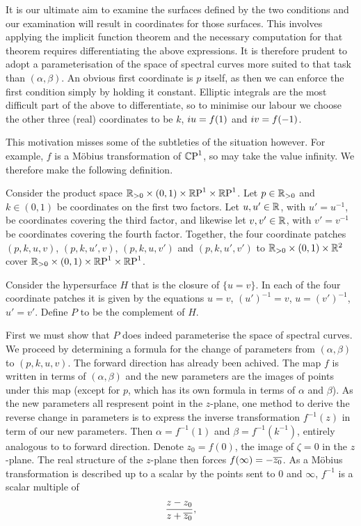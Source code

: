 It is our ultimate aim to examine the surfaces defined by the two conditions and our examination will result in coordinates for those surfaces. This involves applying the implicit function theorem and the necessary computation for that theorem requires differentiating the above expressions. It is therefore prudent to adopt a parameterisation of the space of spectral curves more suited to that task than $(α,β)$. An obvious first coordinate is $p$ itself, as then we can enforce the first condition simply by holding it constant. Elliptic integrals are the most difficult part of the above to differentiate, so to minimise our labour we choose the other three (real) coordinates to be $k$, $i u = f(1)$ and $i v = f(-1)$.

This motivation misses some of the subtleties of the situation however. For example, $f$ is a M\"obius transformation of $\mathbb{C}\text{P}^1$, so may take the value infinity. We therefore make the following definition.

\begin{defn}\label{defn:parameter space}
Consider the product space $\mathbb{R}_{>0} \times (0,1) \times \mathbb{R}\text{P}^1 \times \mathbb{R}\text{P}^1$. Let $p \in \mathbb{R}_{>0}$ and $k \in (0,1)$ be coordinates on the first two factors. Let $u, u' \in \mathbb{R}$, with $u' = u^{-1}$, be coordinates covering the third factor, and likewise let $v, v' \in\mathbb{R}$, with $v' = v^{-1}$ be coordinates covering the fourth factor. Together, the four coordinate patches $(p,k,u,v)$, $(p,k,u',v)$, $(p,k,u,v')$ and $(p,k,u',v')$ to $\mathbb{R}_{>0} \times (0,1) \times \mathbb{R}^2$ cover $\mathbb{R}_{>0} \times (0,1) \times \mathbb{R}\text{P}^1 \times \mathbb{R}\text{P}^1$.

Consider the hypersurface $H$ that is the closure of $\{u=v\}$. In each of the four coordinate patches it is given by the equations $u=v$, $(u')^{-1} = v$, $u = (v')^{-1}$, $u' = v'$. Define $P$ to be the complement of $H$.
\end{defn}

First we must show that $P$ does indeed parameterise the space of spectral curves. We proceed by determining a formula for the change of parameters from $(α,β)$ to $(p,k,u,v)$. The forward direction has already been achived. The map $f$ is written in terms of $(α,β)$  and the new parameters are the images of points under this map (except for $p$, which has its own formula in terms of $α$ and $β$). As the new parameters all respresent point in the $z$-plane, one method to derive the reverse change in parameters is to express the inverse transformation $f^{-1}(z)$ in term of our new parameters. Then $α = f^{-1}(1)$ and $β = f^{-1}(k^{-1})$, entirely analogous to to forward direction. Denote $z_0 = f(0)$, the image of $ζ=0$ in the $z$-plane. The real structure of the $z$-plane then forces $f(\infty) = - \overline{z_0}$. As a M\"obius transformation is described up to a scalar by the points sent to $0$ and $\infty$, $f^{-1}$ is a scalar multiple of
\[
\frac{z-z_0}{z + \overline{z_0}},
\]

